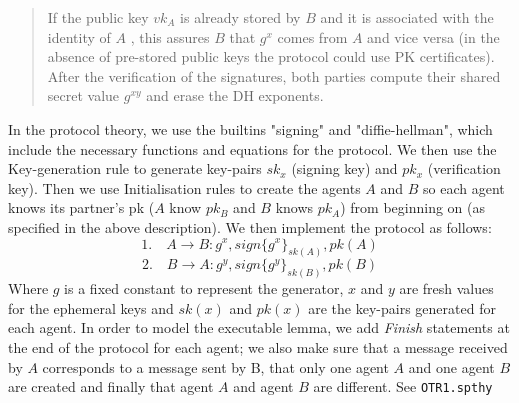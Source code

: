 \documentclass[a4paper,11pt]{scrartcl}
\begin{document}
\begin{quote}
If the public key $vk_A$ is already stored by $B$ and it is associated with the identity of $A$ , this assures $B$ that $g^x$ comes from $A$ and vice versa (in the absence of pre-stored public keys the protocol could use PK certificates). After the verification of the signatures, both parties compute their shared secret value $g^{xy}$ and erase the DH exponents.
\end{quote}
In the protocol theory, we use the builtins "signing" and
"diffie-hellman", which include the necessary functions and equations for the protocol. We then use the Key-generation rule to generate key-pairs $sk_x$ (signing key) and $pk_x$ (verification key). Then we use Initialisation rules to create the agents $A$ and $B$ so each agent knows its partner's pk ($A$ know $pk_B$ and $B$ knows $pk_A$) from beginning on (as specified in the above description).
\newline
We then implement the protocol as follows:
\[ \text{1.} \quad A \rightarrow B: g^x, sign\{g^x\}_{sk(A)}, pk(A) \]
\[ \text{2.} \quad B \rightarrow A: g^y, sign\{g^y\}_{sk(B)}, pk(B) \]
Where $g$ is a fixed constant to represent the generator, $x$ and $y$ are fresh values for the ephemeral keys and
$ sk(x)$ and $pk(x)$ are the key-pairs generated for each agent.
\newline
In order to model the executable lemma, we add \emph{Finish} statements at the end of the protocol for each agent; we also make sure that a message received by $A$ corresponds to a message sent by B, that only one agent $A$ and one agent $B$ are created and finally that agent $A$ and agent $B$ are different.
\newline
See \texttt{OTR1.spthy}
\end{document}
